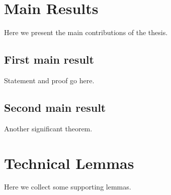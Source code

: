 \documentclass[12pt,reqno]{amsbook}
\theoremstyle{definition}
\begin{document}
\chapter{Main Results}
Here we present the main contributions of the thesis.

\section{First main result}
Statement and proof go here.

\section{Second main result}
Another significant theorem.

\appendix
\chapter{Technical Lemmas}
Here we collect some supporting lemmas.

\end{document}
